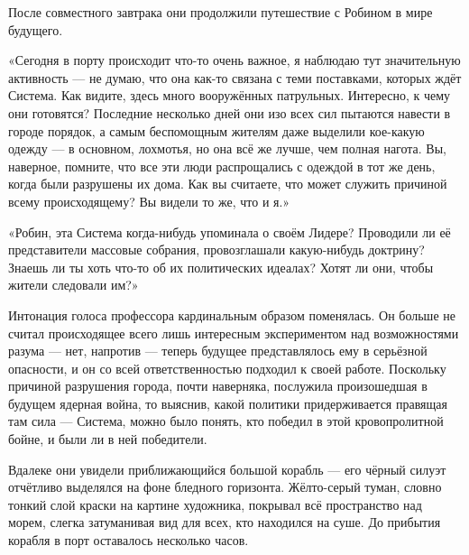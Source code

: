 \documentclass[a4paper,12pt]{book}
\begin{document}
\par
После совместного завтрака они продолжили путешествие с Робином в мире будущего.
\par
«Сегодня в порту происходит что-то очень важное, я наблюдаю тут значительную активность — не думаю, что она как-то связана с теми поставками, которых ждёт Система. Как видите, здесь много вооружённых патрульных. Интересно, к чему они готовятся? Последние несколько дней они изо всех сил пытаются навести в городе порядок, а самым беспомощным жителям даже выделили кое-какую одежду — в основном, лохмотья, но она всё же лучше, чем полная нагота. Вы, наверное, помните, что все эти люди распрощались с одеждой в тот же день, когда были разрушены их дома. Как вы считаете, что может служить причиной всему происходящему? Вы видели то же, что и я.»\\
\par
«Робин, эта Система когда-нибудь упоминала о своём Лидере? Проводили ли её представители массовые собрания, провозглашали какую-нибудь доктрину? Знаешь ли ты хоть что-то об их политических идеалах? Хотят ли они, чтобы жители следовали им?»
\par
Интонация голоса профессора кардинальным образом поменялась. Он больше не считал происходящее всего лишь интересным экспериментом над возможностями разума — нет, напротив — теперь будущее представлялось ему в серьёзной опасности, и он со всей ответственностью подходил к своей работе. Поскольку причиной разрушения города, почти наверняка, послужила произошедшая в будущем ядерная война, то выяснив, какой политики придерживается правящая там сила — Система, можно было понять, кто победил в этой кровопролитной бойне, и были ли в ней победители.\\
\par
Вдалеке они увидели приближающийся большой корабль — его чёрный силуэт отчётливо выделялся на фоне бледного горизонта. Жёлто-серый туман, словно тонкий слой краски на картине художника, покрывал всё пространство над морем, слегка затуманивая вид для всех, кто находился на суше. До прибытия корабля в порт оставалось несколько часов.
\par
\end{document}
